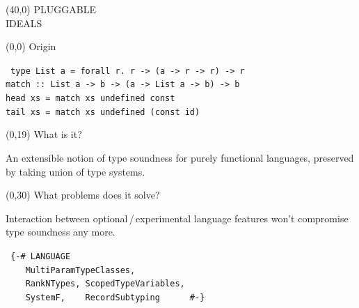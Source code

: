 \documentclass[a0]{a0poster}
\def\FONTSIZE#1{\fontsize{#1}{#1}\selectfont}
\def\HEAD#1{{\FONTSIZE{72}#1}}
\newenvironment{CODE}{\tt\FONTSIZE{36}\null}{}
\begin{document}
\raggedright
\FONTSIZE{45}

\begin{textblock}{71}(40,0)
{\FONTSIZE{320}%
PLUGGABLE\\%
IDEALS
}
\end{textblock}

\begin{textblock}{37}(0,0)%
\HEAD{Origin}


\begin{CODE}
type List a = forall r.~r -> (a -> r -> r) -> r\\
match ::~List a -> b -> (a -> List a -> b) -> b\\
head xs = match xs undefined const\\
tail xs = match xs undefined (const id)\\
\end{CODE}
\end{textblock}

\begin{textblock}{30}(0,19)
\HEAD{What is it?}

An extensible notion of type soundness for purely functional
languages, preserved by taking union of type systems.
\end{textblock}

\begin{textblock}{30}(0,30)
\HEAD{What problems does it solve?}

Interaction between optional\,/\,experimental language features
won't compromise type soundness any more.

\begin{CODE}
\def\INDENT{~~~~}
\{-\# LANGUAGE\\
\INDENT MultiParamTypeClasses,\\
\INDENT RankNTypes, ScopedTypeVariables,\\
\INDENT SystemF,~~~~RecordSubtyping~~~~~~\#-\}\\
\end{CODE}
\end{textblock}
\end{document}
